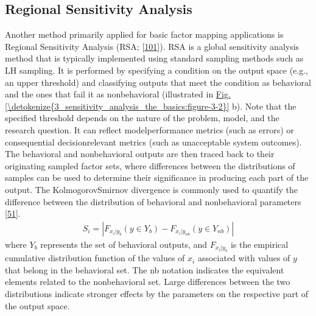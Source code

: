 \documentclass[letterpaper,10pt,english]{sphinxmanual}
\begin{document}
\subsection{Regional Sensitivity Analysis}
\label{\detokenize{3_sensitivity_analysis_the_basics:regional-sensitivity-analysis}}
\sphinxAtStartPar
Another method primarily applied for basic factor mapping applications is Regional Sensitivity Analysis (RSA; {[}\hyperlink{cite.index:id157}{101}{]}). RSA is a global sensitivity analysis method that is typically implemented using standard sampling methods such as LH sampling. It is performed by specifying a condition on the output space (e.g., an upper threshold) and classifying outputs that meet the condition as behavioral and the ones that fail it as non\sphinxhyphen{}behavioral (illustrated in \hyperref[\detokenize{3_sensitivity_analysis_the_basics:figure-3-2}]{Fig.\@ \ref{\detokenize{3_sensitivity_analysis_the_basics:figure-3-2}}} b). Note that the specified threshold depends on the nature of the problem, model, and the research question. It can reflect model\sphinxhyphen{}performance metrics (such as errors) or consequential decision\sphinxhyphen{}relevant metrics (such as unacceptable system outcomes). The behavioral and non\sphinxhyphen{}behavioral outputs are then traced back to their originating sampled factor sets, where differences between the distributions of samples can be used to determine their significance in producing each part of the output. The Kolmogorov\sphinxhyphen{}Smirnov divergence is commonly used to quantify the difference between the distribution of behavioral and non\sphinxhyphen{}behavioral parameters {[}\hyperlink{cite.index:id30}{51}{]}.
\begin{equation*}
\begin{split}S_i=|F_{x_i|y_b} (y \in Y_b)-F_{x_i|y_{nb}} (y \in Y_{nb})|\end{split}
\end{equation*}
\sphinxAtStartPar
where \(Y_b\) represents the set of behavioral outputs, and \(F_{x_i|y_b}\) is the empirical cumulative distribution function of the values of \(x_i\) associated with values of \(y\) that belong in the behavioral set. The nb notation indicates the equivalent elements related to the non\sphinxhyphen{}behavioral set. Large differences between the two distributions indicate stronger effects by the parameters on the respective part of the output space.
\end{document}
